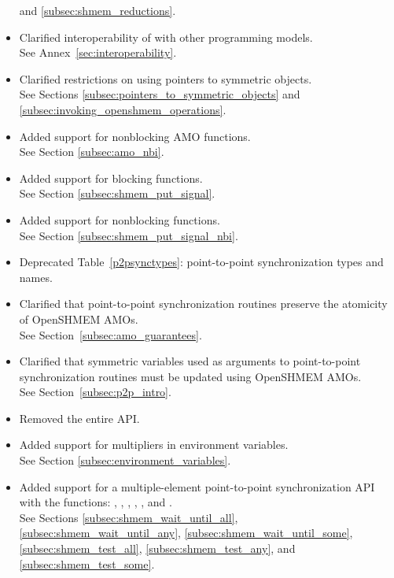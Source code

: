 \begin{itemize}
  and \ref{subsec:shmem_reductions}.
%
\item Clarified interoperability of \openshmem with other programming models.
\\ See Annex~\ref{sec:interoperability}.
%
\item Clarified restrictions on using pointers to symmetric objects.
\\ See Sections
  \ref{subsec:pointers_to_symmetric_objects} and
  \ref{subsec:invoking_openshmem_operations}.
%
\item Added support for nonblocking \ac{AMO} functions.
\\ See Section \ref{subsec:amo_nbi}.
%
\item Added support for blocking  functions.
\\ See Section \ref{subsec:shmem_put_signal}.
%
\item Added support for nonblocking  functions.
\\ See Section \ref{subsec:shmem_put_signal_nbi}.
%
\item Deprecated Table~\ref{p2psynctypes}: point-to-point synchronization types and names.
%
\item Clarified that point-to-point synchronization routines preserve the
  atomicity of OpenSHMEM \acp{AMO}.
\\ See Section~\ref{subsec:amo_guarantees}.
%
\item Clarified that symmetric variables used as  arguments to
  point-to-point synchronization routines must be updated using OpenSHMEM
  \acp{AMO}.
\\ See Section~\ref{subsec:p2p_intro}.
%
\item Removed the entire \openshmem \Fortran API. 
%
\item Added support for multipliers in 
environment variables.
\\ See Section \ref{subsec:environment_variables}.
%
\item Added support for a multiple-element point-to-point synchronization API with
  the functions: , ,
  , ,
  , and .
  \\See Sections \ref{subsec:shmem_wait_until_all},
  \ref{subsec:shmem_wait_until_any}, \ref{subsec:shmem_wait_until_some},
  \ref{subsec:shmem_test_all}, \ref{subsec:shmem_test_any}, and
  \ref{subsec:shmem_test_some}.

\end{itemize}
